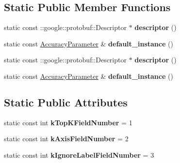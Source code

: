 \subsection*{Static Public Member Functions}
\begin{DoxyCompactItemize}
\item 
\mbox{\label{classcaffe_1_1_accuracy_parameter_a70447a517086ded4794dd3d428e35abf}} 
static const \+::google\+::protobuf\+::\+Descriptor $\ast$ {\bfseries descriptor} ()
\item 
\mbox{\label{classcaffe_1_1_accuracy_parameter_a9cf268b0327240b00e5eb8d89e680e6e}} 
static const \mbox{\hyperlink{classcaffe_1_1_accuracy_parameter}{Accuracy\+Parameter}} \& {\bfseries default\+\_\+instance} ()
\item 
\mbox{\label{classcaffe_1_1_accuracy_parameter_a18babdbe5486fcd105679296d5cb1095}} 
static const \+::google\+::protobuf\+::\+Descriptor $\ast$ {\bfseries descriptor} ()
\item 
\mbox{\label{classcaffe_1_1_accuracy_parameter_a458c386c082dbd633cb22ddbec4841fa}} 
static const \mbox{\hyperlink{classcaffe_1_1_accuracy_parameter}{Accuracy\+Parameter}} \& {\bfseries default\+\_\+instance} ()
\end{DoxyCompactItemize}
\subsection*{Static Public Attributes}
\begin{DoxyCompactItemize}
\item 
\mbox{\label{classcaffe_1_1_accuracy_parameter_ac2d62e5614c2adfdf8f1606caf1b8d58}} 
static const int {\bfseries k\+Top\+K\+Field\+Number} = 1
\item 
\mbox{\label{classcaffe_1_1_accuracy_parameter_aec57c1f67e5b2f71895b41aa647f5a19}} 
static const int {\bfseries k\+Axis\+Field\+Number} = 2
\item 
\mbox{\label{classcaffe_1_1_accuracy_parameter_a998525a6c23efc1f38eb85a645627880}} 
static const int {\bfseries k\+Ignore\+Label\+Field\+Number} = 3
\end{DoxyCompactItemize}
